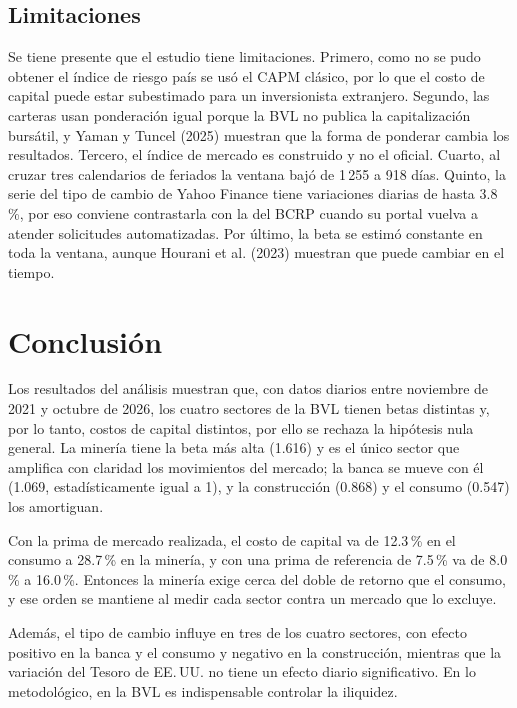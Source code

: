 \documentclass[jrfm,article,submit,oneauthor]{Definitions/mdpi}
\begin{document}
\subsection{Limitaciones}
Se tiene presente que el estudio tiene limitaciones. Primero, como no se pudo obtener el índice de riesgo país se usó el CAPM clásico, por lo que el costo de capital puede estar subestimado para un inversionista extranjero. Segundo, las carteras usan ponderación igual porque la BVL no publica la capitalización bursátil, y Yaman y Tuncel (2025) muestran que la forma de ponderar cambia los resultados. Tercero, el índice de mercado es construido y no el oficial. Cuarto, al cruzar tres calendarios de feriados la ventana bajó de 1\,255 a 918 días. Quinto, la serie del tipo de cambio de Yahoo Finance tiene variaciones diarias de hasta 3.8\,\%, por eso conviene contrastarla con la del BCRP cuando su portal vuelva a atender solicitudes automatizadas. Por último, la beta se estimó constante en toda la ventana, aunque Hourani et al. (2023) muestran que puede cambiar en el tiempo.

\section{Conclusión}
Los resultados del análisis muestran que, con datos diarios entre noviembre de 2021 y octubre de 2026, los cuatro sectores de la BVL tienen betas distintas y, por lo tanto, costos de capital distintos, por ello se rechaza la hipótesis nula general. La minería tiene la beta más alta (1.616) y es el único sector que amplifica con claridad los movimientos del mercado; la banca se mueve con él (1.069, estadísticamente igual a 1), y la construcción (0.868) y el consumo (0.547) los amortiguan.

Con la prima de mercado realizada, el costo de capital va de 12.3\,\% en el consumo a 28.7\,\% en la minería, y con una prima de referencia de 7.5\,\% va de 8.0\,\% a 16.0\,\%. Entonces la minería exige cerca del doble de retorno que el consumo, y ese orden se mantiene al medir cada sector contra un mercado que lo excluye.

Además, el tipo de cambio influye en tres de los cuatro sectores, con efecto positivo en la banca y el consumo y negativo en la construcción, mientras que la variación del Tesoro de EE.\,UU. no tiene un efecto diario significativo. En lo metodológico, en la BVL es indispensable controlar la iliquidez.
\end{document}

